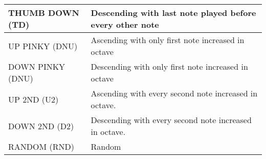\begin{tabular}{|l|l|}
THUMB DOWN (TD)                & Descending with last note played before every other note                                                                                                                         \\ \hline
UP PINKY  (DNU)                & Ascending with only first note increased in octave                                                                                                                                                                 \\ \hline
DOWN PINKY (DNU)                & Descending with only first note increased in octave                                                                                           
                                       \\ \hline
UP 2ND (U2)                & Ascending with every second note increased in octave.                                                                                             
                                       \\ \hline
DOWN 2ND (D2)                & Descending with every second note increased in octave. 
                                       \\ \hline
RANDOM (RND)                & Random                                                                                                                   
                                       \\ \hline
\end{tabular}

